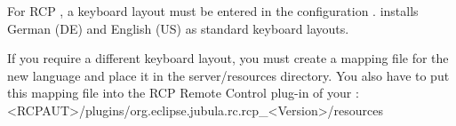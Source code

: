 
For RCP \gdauts{}, a keyboard layout must be entered in the \gdaut{} configuration . \app{} installs German (DE) and English (US) as standard keyboard layouts. 

If you require a different keyboard layout, you must create a mapping file for the new language  and place it in the server/resources directory. You also have to put this mapping file into the RCP Remote Control plug-in of your \gdaut{}:\\


<RCPAUT>/plugins/org.eclipse.jubula.rc.rcp\_<Version>/resources


